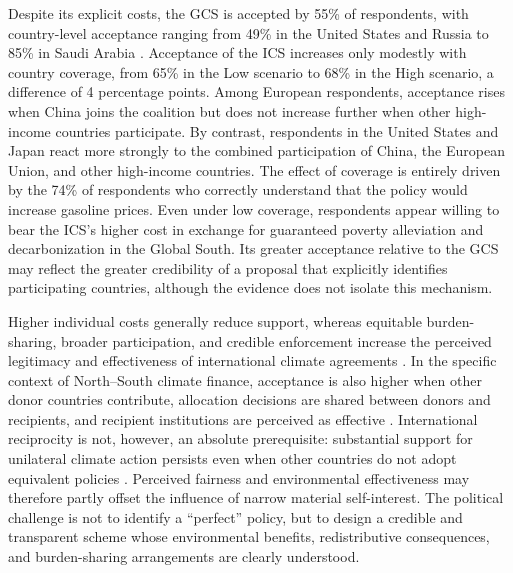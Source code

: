 \documentclass[11pt,a4paper]{article}
\begin{document}
Despite its explicit costs, the GCS is accepted by 55\% of respondents, with country-level acceptance ranging from 49\% in the United States and Russia to 85\% in Saudi Arabia \citep{fabre_public_2026}. Acceptance of the ICS increases only modestly with country coverage, from 65\% in the Low scenario to 68\% in the High scenario, a difference of 4 %
percentage points. Among European respondents, acceptance rises when China joins the coalition but does not increase further when other high-income countries participate. By contrast, respondents in the United States and Japan react more strongly %
to the combined participation of China, the European Union, and other high-income countries. The effect of coverage is entirely driven by the 74\% of respondents who correctly understand that the policy would increase gasoline prices. Even under low coverage, respondents appear willing to bear the ICS's higher cost in exchange for guaranteed poverty alleviation and decarbonization in the Global South. Its greater acceptance relative to the GCS may reflect the greater credibility of a proposal that explicitly identifies participating countries, although the evidence does not isolate this mechanism.

Higher individual costs generally reduce support, whereas equitable burden-sharing, broader participation, and credible enforcement increase the perceived legitimacy and effectiveness of international climate agreements \citep{bechtel_mass_2013}. In the specific context of North--South climate finance, acceptance is also higher when other donor countries contribute, allocation decisions %
are shared between donors and recipients, and recipient institutions are perceived as effective \citep{gampfer_obtaining_2014}. International reciprocity is not, however, an absolute prerequisite: substantial support for unilateral climate action persists even when other countries do not adopt equivalent policies \citep{bernauer_how_2015,tingley_conditional_2014,mcgrath_how_2017}. Perceived fairness and environmental effectiveness may therefore partly offset the influence of narrow material self-interest. The political challenge is not to identify a ``perfect'' policy, but to design a credible and transparent scheme whose environmental benefits, redistributive consequences, and burden-sharing arrangements are clearly understood.
\end{document}
